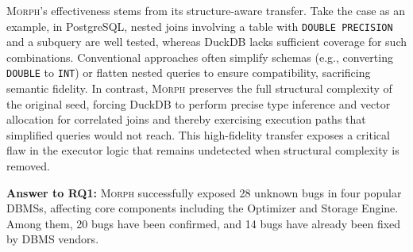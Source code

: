\documentclass[conference]{IEEEtran}
\newcommand{\tool}{\textsc{Morph}\xspace}
\newcommand{\bugcnt}{28\xspace}
\newcommand{\bugconfirmcnt}{20\xspace}
\newcommand{\bugfixcnt}{14\xspace}
\newcommand{\pg}{PostgreSQL\xspace}
\newcommand{\duckdb}{DuckDB\xspace}
\begin{document}
\tool{}’s effectiveness stems from its structure-aware transfer. Take the case as an example, in \pg{}, nested joins involving a table with \texttt{DOUBLE PRECISION} and a subquery are well tested, whereas \duckdb{} lacks sufficient coverage for such combinations. Conventional approaches often simplify schemas (e.g., converting \texttt{DOUBLE} to \texttt{INT}) or flatten nested queries to ensure compatibility, sacrificing semantic fidelity. In contrast, \tool{} preserves the full structural complexity of the original seed, forcing DuckDB to perform precise type inference and vector allocation for correlated joins and thereby exercising execution paths that simplified queries would not reach. This high-fidelity transfer exposes a critical flaw in the executor logic that remains undetected when structural complexity is removed.

\begin{answerbox}
\textbf{Answer to RQ1:} 
\tool{} successfully exposed \bugcnt{} unknown bugs in four popular DBMSs, affecting core components including the Optimizer and Storage Engine. Among them, \bugconfirmcnt{} bugs have been confirmed, and \bugfixcnt{} bugs have already been fixed by DBMS vendors.
\end{answerbox}
\end{document}
